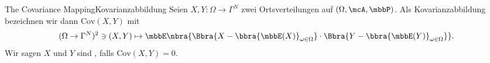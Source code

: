 \begin{mdef}{The Covariance Mapping}{Kovarianzabbildung}
    Seien $X,Y:\Omega\to\Gamma^N$ zwei Ortsverteilungen auf $(\Omega,\mcA,\mbbP)$. Als Kovarianzabbildung bezeichnen wir dann $\text{Cov}(X,Y)$ mit
    \[
        (\Omega\to\Gamma^N)^2\ni (X,Y)\mapsto \mbbE\nbra{
            \Bbra{X - \bbra{\mbbE(X)}_{\omega\in\Omega}}\cdot\Bbra{Y - \bbra{\mbbE(Y)}_{\omega\in\Omega}}
        }.
    \]
    Wir sagen $X$ und $Y$ sind , falls $\text{Cov}(X,Y) = 0$.
\end{mdef}